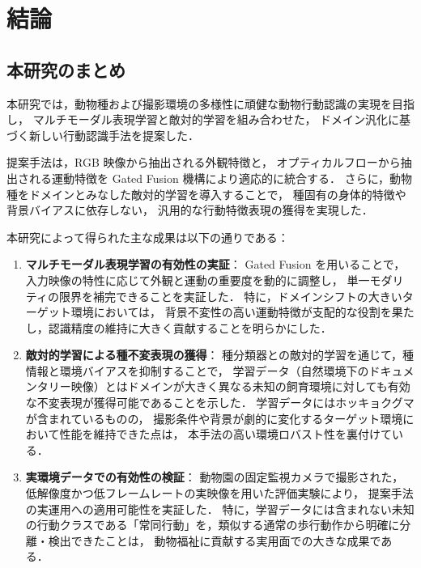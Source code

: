 \chapter{結論}
\label{chap:conclusion}

\section{本研究のまとめ}
本研究では，動物種および撮影環境の多様性に頑健な動物行動認識の実現を目指し，
マルチモーダル表現学習と敵対的学習を組み合わせた，
ドメイン汎化に基づく新しい行動認識手法を提案した．

提案手法は，RGB 映像から抽出される外観特徴と，
オプティカルフローから抽出される運動特徴を
Gated Fusion 機構により適応的に統合する．
さらに，動物種をドメインとみなした敵対的学習を導入することで，
種固有の身体的特徴や背景バイアスに依存しない，
汎用的な行動特徴表現の獲得を実現した．

本研究によって得られた主な成果は以下の通りである：

\begin{enumerate}
  \item \textbf{マルチモーダル表現学習の有効性の実証}：
    Gated Fusion を用いることで，入力映像の特性に応じて外観と運動の重要度を動的に調整し，
    単一モダリティの限界を補完できることを実証した．
    特に，ドメインシフトの大きいターゲット環境においては，
    背景不変性の高い運動特徴が支配的な役割を果たし，認識精度の維持に大きく貢献することを明らかにした．

  \item \textbf{敵対的学習による種不変表現の獲得}：
    種分類器との敵対的学習を通じて，種情報と環境バイアスを抑制することで，
    学習データ（自然環境下のドキュメンタリー映像）とはドメインが大きく異なる未知の飼育環境に対しても有効な不変表現が獲得可能であることを示した．
    学習データにはホッキョクグマが含まれているものの，
    撮影条件や背景が劇的に変化するターゲット環境において性能を維持できた点は，
    本手法の高い環境ロバスト性を裏付けている．

  \item \textbf{実環境データでの有効性の検証}：
    動物園の固定監視カメラで撮影された，低解像度かつ低フレームレートの実映像を用いた評価実験により，
    提案手法の実運用への適用可能性を実証した．
    特に，学習データには含まれない未知の行動クラスである「常同行動」を，類似する通常の歩行動作から明確に分離・検出できたことは，
    動物福祉に貢献する実用面での大きな成果である．
\end{enumerate}

